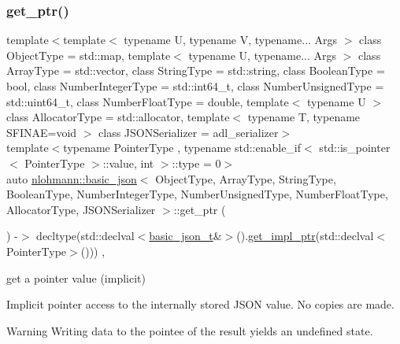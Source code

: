 \subsubsection{\texorpdfstring{get\+\_\+ptr()}{get\_ptr()}\hspace{0.1cm}{\footnotesize\ttfamily [1/2]}}
{\footnotesize\ttfamily template$<$template$<$ typename U, typename V, typename... Args $>$ class Object\+Type = std\+::map, template$<$ typename U, typename... Args $>$ class Array\+Type = std\+::vector, class String\+Type  = std\+::string, class Boolean\+Type  = bool, class Number\+Integer\+Type  = std\+::int64\+\_\+t, class Number\+Unsigned\+Type  = std\+::uint64\+\_\+t, class Number\+Float\+Type  = double, template$<$ typename U $>$ class Allocator\+Type = std\+::allocator, template$<$ typename T, typename S\+F\+I\+N\+A\+E=void $>$ class J\+S\+O\+N\+Serializer = adl\+\_\+serializer$>$ \\
template$<$typename Pointer\+Type , typename std\+::enable\+\_\+if$<$ std\+::is\+\_\+pointer$<$ Pointer\+Type $>$\+::value, int $>$\+::type  = 0$>$ \\
auto \mbox{\hyperlink{classnlohmann_1_1basic__json}{nlohmann\+::basic\+\_\+json}}$<$ Object\+Type, Array\+Type, String\+Type, Boolean\+Type, Number\+Integer\+Type, Number\+Unsigned\+Type, Number\+Float\+Type, Allocator\+Type, J\+S\+O\+N\+Serializer $>$\+::get\+\_\+ptr (\begin{DoxyParamCaption}{ }\end{DoxyParamCaption}) -\/$>$ decltype(std\+::declval$<$\mbox{\hyperlink{classnlohmann_1_1basic__json_afff7860310ae69f29f8158a77ec0ef13}{basic\+\_\+json\+\_\+t}}\&$>$().\mbox{\hyperlink{classnlohmann_1_1basic__json_a58b65f595883fb93333423ec5e3bafee}{get\+\_\+impl\+\_\+ptr}}(std\+::declval$<$Pointer\+Type$>$()))
    \hspace{0.3cm}{\ttfamily [inline]}, {\ttfamily [noexcept]}}



get a pointer value (implicit) 

Implicit pointer access to the internally stored J\+S\+ON value. No copies are made.

\begin{DoxyWarning}{Warning}
Writing data to the pointee of the result yields an undefined state.
\end{DoxyWarning}

